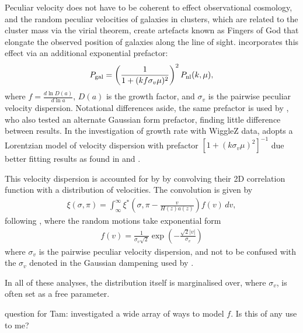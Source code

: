 \documentclass[titlesmallcaps, examinerscopy, copyrightpage]{uqthesis}
\newcommand\abs[1]{\left|#1\right|}
\newcommand{\red}{\color{red}}
\begin{document}
Peculiar velocity does not have to be coherent to effect observational cosmology, and the random peculiar velocities of galaxies in clusters, which are related to the cluster mass via the virial theorem, create artefacts known as Fingers of God that elongate the observed position of galaxies along the line of sight. \citet{SanchezKazinBeutler2013} incorporates this effect via an additional exponential prefactor:
\begin{align}
P_{\rm{gal}} = \left( \frac{1}{1 + (k f \sigma_v \mu )^2} \right)^2  P_{\rm{nl}}(k, \mu),
\end{align}
where $f = \frac{d \ln D(a)}{d \ln a}$, $D(a)$ is the growth factor, and $\sigma_v$ is the pairwise peculiar velocity dispersion. Notational differences aside, the same prefactor is used by \citet{XuPadmanabhan2012}, who also tested an alternate Gaussian form prefactor, finding little difference between results. In the investigation of growth rate with WiggleZ data, \citet{BlakeBroughColless2011} adopts a Lorentzian model of velocity dispersion with prefactor $[1 + (k \sigma_v \mu)^2]^{-1}$ due better fitting results as found in \citet{HawkinsMaddoxCole2003} and \citet{CabreGaztanaga2009}.

This velocity dispersion is accounted for by \citet{ChuangWang2012} by convolving their 2D correlation function with a distribution of velocities. The convolution is given by
\begin{align}
\xi(\sigma, \pi) = \int_\infty^\infty \xi^* \left(\sigma, \pi - \frac{v}{H(z) a(z)} \right) f(v)\, dv,
\end{align} 
following \citet{Peebles1980}, where the random motions take exponential form \citep{RatcliffeShanks1998,Landy2002}
\begin{align}
f(v) = \frac{1}{\sigma_v \sqrt{2}} \exp\left(- \frac{\sqrt{2}\abs{v}}{\sigma_v} \right)
\end{align}
where $\sigma_v$ is the pairwise peculiar velocity dispersion, and not to be confused with the $\sigma_v$ denoted in the Gaussian dampening used by \citet{BlakeDavis2011}.

In all of these analyses, the distribution itself is marginalised over, where $\sigma_v$, is often set as a free parameter.

{\red question for Tam: \citet{BlakeBroughColless2011} investigated a wide array of ways to model $f$. Is this of any use to me?}
\end{document}
